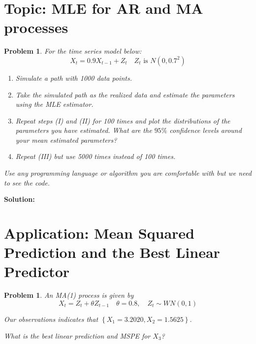 \documentclass[11pt]{article}
\theoremstyle{plain} %
\newtheorem{problem}[theorem]{Problem}
\newenvironment{solution}
{\color{C2}\normalfont\begin{framed}\begingroup\textbf{Solution:} }
  {\endgroup\end{framed}}
\theoremstyle{remark}
\begin{document}
\section{Topic: MLE for AR and MA processes}
\begin{problem}
For the time series model below:
$$
  X_{t}=0.9 X_{t-1}+Z_{t} \quad Z_{t} \text{ is } N\left(0,0.7^{2}\right)
$$

\begin{enumerate}[label = (\Roman*)]
  \item Simulate a path with 1000 data points.
  \item Take the simulated path as the realized data and estimate the parameters using the MLE estimator.
  \item Repeat steps (I) and (II) for 100 times and plot the distributions of the parameters you have estimated. What are the $95 \%$ confidence levels around your mean estimated parameters?
  \item Repeat (III) but use 5000 times instead of 100 times.
\end{enumerate}

Use any programming language or algorithm you are comfortable with but we need to see the code.

\end{problem}
\begin{solution}

\end{solution}


\section{Application: Mean Squared Prediction and the Best Linear Predictor}
\begin{problem}
An MA(1) process is given by
$$
  X_{t}=Z_{t}+\theta Z_{t-1} \quad \theta=0.8, \quad Z_{t} \sim W N(0,1)
$$

Our observations indicates that $\left\{X_{1}=3.2020, X_{2}=1.5625\right\}$.

What is the best linear prediction and MSPE for $X_{3}$?
\end{problem}
\end{document}
